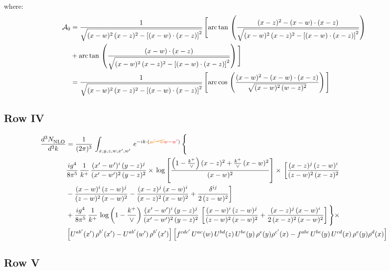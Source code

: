 \documentclass[9pt]{article}
\numberwithin{equation}{section}
\begin{document}
where: \begin{align}
\mathcal{A}_{0} & = \frac{1}{\sqrt{(x-w)^{2}\,(x-z)^{2}-\left[(x-w)\cdot (x-z)\right]^{2}}}\, \Bigg[\mathrm{arc\,tan}\,\left(\frac{(x-z)^{2}-(x-w)\cdot (x-z)}{\sqrt{(x-w)^{2}\,(x-z)^{2}-\left[(x-w)\cdot (x-z)\right]^{2}}}\right)\notag \\ & + \mathrm{arc\,tan}\,\left(\frac{(x-w)\cdot (x-z)}{\sqrt{(x-w)^{2}\,(x-z)^{2}-\left[(x-w)\cdot (x-z)\right]^{2}}}\right) \Bigg]\notag \\ & = \frac{1}{\sqrt{(x-w)^{2}\,(x-z)^{2}-\left[(x-w)\cdot (x-z)\right]^{2}}}\, \Bigg[\mathrm{arc\,cos}\,\left(\frac{(x-w)^{2}-(x-w)\cdot (x-z)}{\sqrt{(x-w)^{2}\,(w-z)^{2}}}\right)\Bigg]
\end{align}
\subsection{Row IV}
\begin{align}
    \frac{d^{3}N_{\rm NLO}^{\rm}}{d^{3}k}  & =   \frac{1}{(2\pi)^{3}}\,
    \int_{x,y,z,w,x',w'}\,e^{-ik\cdot ({\color{orange}\cancel{w^\prime-w}}{\color{red}w-w^\prime})}\,\Bigg\{\notag \\
& \frac{ig^{4}}{8\pi^{5}}\,\frac{1}{k^{+}}\,\frac{(x'-w')^{i}\,(y-z)^{j}}{(x'-w')^{2}\,(y-z)^{2}}\times\,\log{\left[\frac{\left(1-\frac{k^{+}}{\vee}\right)(x-z)^{2}+\frac{k^{+}}{\vee}\,(x-w)^{2}}{(x-w)^{2}}\right]}\times\, \bigg[\frac{(x-z)^{j}\,(z-w)^{i}}{(z-w)^{2}\,(x-z)^{2}}\notag \\ & -\frac{(x-w)^{i}\,(z-w)^{j}}{(z-w)^{2}\,(x-w)^{2}}-\frac{(x-z)^{j}\,(x-w)^{i}}{(x-z)^{2}\,(x-w)^{2}}+\frac{\delta^{ij}}{2\,(z-w)^{2}}\bigg] \notag \\
& + \frac{ig^{4}}{8\pi^{5}}\,\frac{1}{k^{+}}\,\log{\left(1-\frac{k^{+}}{\vee}\right)}\,\frac{(x'-w')^{i}\,(y-z)^{j}}{(x'-w')^{2}\,(y-z)^{2}}\,\left[\frac{(x-w)^{i}\,(z-w)^{j}}{(z-w)^{2}\,(x-w)^{2}}+\frac{(x-z)^{j}\,(x-w)^{i}}{2\, (x-z)^{2}\,(x-w)^{2}}\right]\Bigg\}\times\notag \\ &  \left[U^{ab'}(x')\,\rho^{b'}(x')-U^{ab'}(w')\,\rho^{b'}(x')\right] \left[f^{cdc'}\,U^{ac}(w)\,U^{bd}(z)\,U^{be}(y)\,\rho^{e}(y)\rho^{c'}(x)-f^{abc}\,U^{be}(y)\,U^{cd}(x)\,\rho^{e}(y)\rho^{d}(x)\right]
\end{align}
\subsection{Row V}
\end{document}

